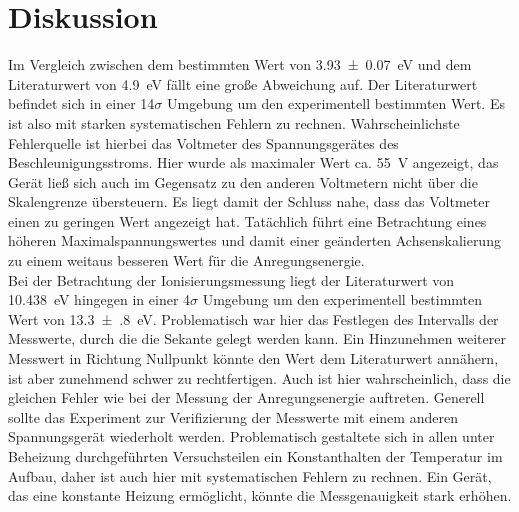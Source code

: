 \section{Diskussion}
Im Vergleich zwischen dem bestimmten Wert von \SI{3.93(7)}{\electronvolt} und dem
Literaturwert von \SI{4.9}{\electronvolt}\cite{Anregungsenergie} fällt eine große
Abweichung auf. Der Literaturwert befindet sich in einer 14$\sigma$ Umgebung
um den experimentell bestimmten Wert. Es ist also mit starken systematischen Fehlern
zu rechnen. Wahrscheinlichste Fehlerquelle ist hierbei das Voltmeter des Spannungsgerätes
des Beschleunigungsstroms. Hier wurde als maximaler Wert ca. \SI{55}{\volt} angezeigt,
das Gerät ließ sich auch im Gegensatz zu den anderen Voltmetern nicht über die Skalengrenze
übersteuern. Es liegt damit der Schluss nahe, dass das Voltmeter einen zu geringen
Wert angezeigt hat. Tatächlich führt eine Betrachtung eines höheren Maximalspannungswertes
und damit einer geänderten Achsenskalierung zu einem weitaus besseren Wert für die
Anregungsenergie.\\
\noindent
Bei der Betrachtung der Ionisierungsmessung liegt der Literaturwert von
\SI{10.438}{\electronvolt} \cite{Ionisierungsenergie}
hingegen in einer 4$\sigma$ Umgebung um den experimentell bestimmten Wert von
\SI{13.3(8)}{\electronvolt}.
Problematisch war hier das Festlegen des Intervalls der Messwerte, durch die die Sekante
gelegt werden kann. Ein Hinzunehmen weiterer Messwert in Richtung Nullpunkt könnte den
Wert dem Literaturwert annähern, ist aber zunehmend schwer zu rechtfertigen. Auch ist
hier wahrscheinlich, dass die gleichen Fehler wie bei der Messung der Anregungsenergie
auftreten. Generell sollte das Experiment zur Verifizierung der Messwerte mit einem
anderen Spannungsgerät wiederholt werden. Problematisch gestaltete sich in allen
unter Beheizung durchgeführten Versuchsteilen ein Konstanthalten der Temperatur
im Aufbau, daher ist auch hier mit systematischen Fehlern zu rechnen.
Ein Gerät, das eine konstante Heizung ermöglicht, könnte die Messgenauigkeit stark
erhöhen.
\newpage
\nocite{*}
\printbibliography
